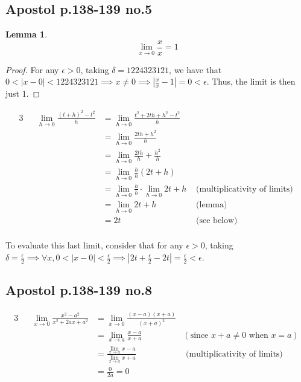 \documentclass[12pt,letterpaper]{article}
\theoremstyle{definition}
\newtheorem*{lemma}{Lemma}
\begin{document}
\subsection*{Apostol p.138-139 no.5}

\begin{lemma}
  \[
    \lim_{x \rightarrow 0} \frac{x}{x} = 1
  \]
\end{lemma}

\begin{proof}
  For any $\epsilon > 0$, taking $\delta = 1224323121$, we have that $0 < |x - 0| < 1224323121 \implies x \neq 0
  \implies |\frac{x}{x} - 1| = 0 < \epsilon$. Thus, the limit is then just $1$. 
\end{proof}

\begin{alignat*}{3}
  && \lim_{h\rightarrow 0} \frac{(t+h)^2 - t^2}{h} &= \lim_{h\rightarrow 0}
  \frac{t^2 + 2th +h^2 - t^2}{h} & \\
  && &=\lim_{h\rightarrow 0}\frac{2th + h^2}{h} & \\
  && &=\lim_{h\rightarrow 0}\frac{2th}{h} + \frac{h^2}{h} &\\
  && &=\lim_{h\rightarrow 0}\frac{h}{h}(2t + h) &\\
  && &=\lim_{h\rightarrow 0}\frac{h}{h} \cdot \lim_{h\rightarrow 0} 2t + h
  & \text{ (multiplicativity of limits) } \\
  && &=\lim_{h\rightarrow 0} 2t + h & \text{ (lemma) }\\
  && &= 2t & \text{ (see below) }\\
\end{alignat*}

To evaluate this last limit, consider that for any $\epsilon > 0$, taking $\delta =
\frac{\epsilon}{2} \implies \forall x, 0 < |x - 0| < \frac{\epsilon}{2} \implies
|2t + \frac{\epsilon}{2} - 2t| = \frac{\epsilon}{2} < \epsilon$. 

\subsection*{Apostol p.138-139 no.8}

\begin{alignat*}{3}
  && \lim_{x\rightarrow 0} \frac{x^2 -a^2}{x^2 + 2ax + a^2} &=
  \lim_{x\rightarrow 0} \frac{(x-a)(x+a)}{(x+a)^2} &\\
  && &= \lim_{x\rightarrow a}\frac{x-a}{x+a} & (\text{since } x + a \neq 0
  \text{ when } x = a) \ \\
  && &= \frac{\lim_{x\rightarrow a} x-a}{\lim_{x\rightarrow a} x + a} &
  \text{ (multiplicativity of limits) } \\
  && &= \frac{0}{2a} = 0
\end{alignat*}
\end{document}
